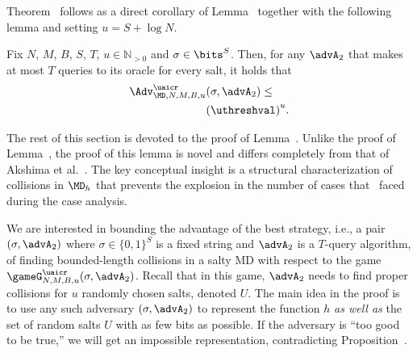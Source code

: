 Theorem~ follows as a direct corollary of Lemma~ together with the following lemma and setting $u=S+\log N$.

\begin{lemma} \label{lem:comp}
  Fix $N$, $M$, $B$, $S$, $T$, $u\in \mathbb{N}_{>0}$ and $\sigma\in \bits^S$. Then, for any $\advA_2$ that makes at most $T$ queries to its oracle for every salt, it holds that 
  \begin{align*}
  \Adv_{\MD,N,M,B,u}^{\uaicr}&(\sigma, \advA_2) \leq \\ & {\left(\uthreshval\right)}^u . 
    \end{align*}
\end{lemma}

The rest of this section is devoted to the proof of Lemma~. Unlike the proof of Lemma~, the proof of this lemma is novel and differs completely from that of Akshima et al.~\cite{AkshimaCDW20}. The key conceptual insight is a structural characterization of collisions in $\MD_h$ that prevents the explosion in the number of cases that~\cite{AkshimaCDW20} faced during the case analysis.



%
We are interested in bounding the advantage of the best strategy, i.e., a pair  $(\sigma,\advA_2)$ where $\sigma\in \{0,1\}^S$ is a fixed string and $\advA_2$ is a $T$-query algorithm, of finding bounded-length collisions in a salty MD with respect to the game $\gameG^\uaicr_{N,M,B,u}(\sigma, \advA_2)$.  Recall that in this game, $\advA_2$ needs to find proper collisions for $u$ randomly chosen salts, denoted $U$. The main idea in the proof is to use any such adversary  $(\sigma,\advA_2)$ to represent the function $h$ \emph{as well as} the set of random salts $U$ with as few bits as possible.  If the adversary is ``too good to be true,'' we will get an impossible representation, contradicting Proposition~.

